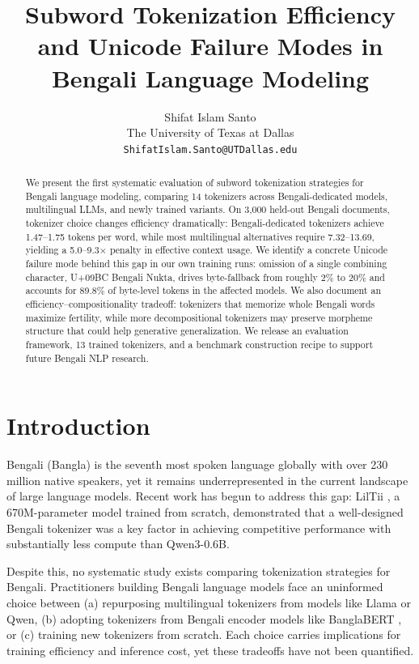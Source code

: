 \documentclass[11pt,a4paper]{article}
\title{Subword Tokenization Efficiency and Unicode Failure Modes in Bengali Language Modeling}
\author{
  Shifat Islam Santo \\
  The University of Texas at Dallas \\
  \texttt{ShifatIslam.Santo@UTDallas.edu}
}
\begin{document}
\maketitle

\begin{abstract}
We present the first systematic evaluation of subword tokenization strategies for Bengali language modeling, comparing 14 tokenizers across Bengali-dedicated models, multilingual LLMs, and newly trained variants.
On 3,000 held-out Bengali documents, tokenizer choice changes efficiency dramatically: Bengali-dedicated tokenizers achieve 1.47--1.75 tokens per word, while most multilingual alternatives require 7.32--13.69, yielding a 5.0--9.3$\times$ penalty in effective context usage.
We identify a concrete Unicode failure mode behind this gap in our own training runs: omission of a single combining character, U+09BC Bengali Nukta, drives byte-fallback from roughly 2\% to 20\% and accounts for 89.8\% of byte-level tokens in the affected models.
We also document an efficiency--compositionality tradeoff: tokenizers that memorize whole Bengali words maximize fertility, while more decompositional tokenizers may preserve morpheme structure that could help generative generalization.
We release an evaluation framework, 13 trained tokenizers, and a benchmark construction recipe to support future Bengali NLP research.
\end{abstract}

\section{Introduction}

Bengali (Bangla) is the seventh most spoken language globally with over 230 million native speakers, yet it remains underrepresented in the current landscape of large language models.
Recent work has begun to address this gap: LilTii \cite{liltii2026}, a 670M-parameter model trained from scratch, demonstrated that a well-designed Bengali tokenizer was a key factor in achieving competitive performance with substantially less compute than Qwen3-0.6B.

Despite this, no systematic study exists comparing tokenization strategies for Bengali.
Practitioners building Bengali language models face an uninformed choice between (a) repurposing multilingual tokenizers from models like Llama or Qwen, (b) adopting tokenizers from Bengali encoder models like BanglaBERT \cite{banglabert2022}, or (c) training new tokenizers from scratch.
Each choice carries implications for training efficiency and inference cost, yet these tradeoffs have not been quantified.
\end{document}
